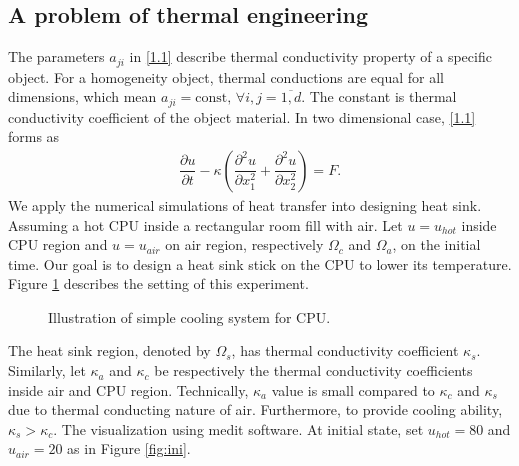 \subsection{A problem of thermal engineering}
\quad The parameters $a_{ji}$ in \eqref{1.1} describe thermal conductivity property of a specific object. For a homogeneity object, thermal conductions are equal for all dimensions, which mean $a_{ji}=\text{const},\, \forall i,j=\overline{1,d}$. The constant is thermal conductivity coefficient of the object material. In two dimensional case, \eqref{1.1} forms as
\begin{align}\label{4.2}
	\dfrac{\partial u}{\partial t} - \kappa \left(\dfrac{\partial^2 u}{\partial x_1^2}+\dfrac{\partial^2 u}{\partial x_2^2}\right) = F.
\end{align}
\quad We apply the numerical simulations of heat transfer into designing heat sink. Assuming a hot CPU inside a rectangular room fill with air. Let $u=u_{hot}$ inside CPU region and $u=u_{air}$ on air region, respectively $\Omega_{c}$ and $\Omega_{a}$, on the initial time. Our goal is to design a heat sink stick on the CPU to lower its temperature. Figure \ref{fig:testsink} describes the setting of this experiment.\\
\begin{figure}[h!]
	\centering
	\caption{Illustration of simple cooling system for CPU.}
	\label{fig:testsink}
\end{figure}
The heat sink region, denoted by $\Omega_{s}$, has thermal conductivity coefficient $\kappa_s$. Similarly, let $\kappa_a$ and $\kappa_c$ be respectively the thermal conductivity coefficients inside air and CPU region. Technically, $\kappa_a$ value is small compared to $\kappa_c$ and $\kappa_s$ due to thermal conducting nature of air. Furthermore, to provide cooling ability, $\kappa_s>\kappa_c$. The visualization using medit software. At initial state, set $u_{hot}=80$ and $u_{air}=20$ as in Figure \ref{fig:ini}.\\
